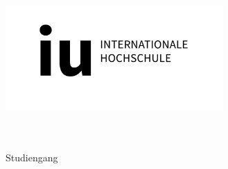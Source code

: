 \clearpage
\thispagestyle{empty}

\begin{titlingpage} %
\begin{center}

\includegraphics[height=4cm]{images/iu_logo.png} %
\\
\large{\NameOfUniversity{}}\\
\small{\TypeOfStudy{}}\\ %
\vspace{1cm}

\small{Studiengang}\\
\large{\NameOfStudyProgram{}}
\vspace{1.75cm}

\small{\textbf{\TypeOfWork{}}}
\vspace{0.25cm}

\Large{\textbf{\thetitle}}\\
\vspace{0.5cm}

\small{\NameOfCourse{}}\\
\vspace{3cm}

\theauthor\\
\StudentNumber{}\\
\thedate
\vspace{1cm}

\NameOfProf{}\\

\end{center}
\end{titlingpage}
\pagebreak